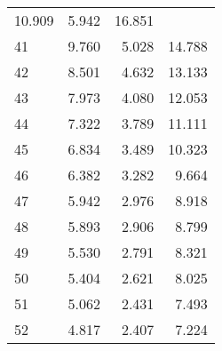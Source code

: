 \begin{tabular}{llll}
  \multicolumn{1}{|r}{10.909} &
  \multicolumn{1}{r}{5.942} &
  \multicolumn{1}{r}{16.851} \\
\multicolumn{1}{l}{\hspace{1em}41} &
  \multicolumn{1}{|r}{9.760} &
  \multicolumn{1}{r}{5.028} &
  \multicolumn{1}{r}{14.788} \\
\multicolumn{1}{l}{\hspace{1em}42} &
  \multicolumn{1}{|r}{8.501} &
  \multicolumn{1}{r}{4.632} &
  \multicolumn{1}{r}{13.133} \\
\multicolumn{1}{l}{\hspace{1em}43} &
  \multicolumn{1}{|r}{7.973} &
  \multicolumn{1}{r}{4.080} &
  \multicolumn{1}{r}{12.053} \\
\multicolumn{1}{l}{\hspace{1em}44} &
  \multicolumn{1}{|r}{7.322} &
  \multicolumn{1}{r}{3.789} &
  \multicolumn{1}{r}{11.111} \\
\multicolumn{1}{l}{\hspace{1em}45} &
  \multicolumn{1}{|r}{6.834} &
  \multicolumn{1}{r}{3.489} &
  \multicolumn{1}{r}{10.323} \\
\multicolumn{1}{l}{\hspace{1em}46} &
  \multicolumn{1}{|r}{6.382} &
  \multicolumn{1}{r}{3.282} &
  \multicolumn{1}{r}{9.664} \\
\multicolumn{1}{l}{\hspace{1em}47} &
  \multicolumn{1}{|r}{5.942} &
  \multicolumn{1}{r}{2.976} &
  \multicolumn{1}{r}{8.918} \\
\multicolumn{1}{l}{\hspace{1em}48} &
  \multicolumn{1}{|r}{5.893} &
  \multicolumn{1}{r}{2.906} &
  \multicolumn{1}{r}{8.799} \\
\multicolumn{1}{l}{\hspace{1em}49} &
  \multicolumn{1}{|r}{5.530} &
  \multicolumn{1}{r}{2.791} &
  \multicolumn{1}{r}{8.321} \\
\multicolumn{1}{l}{\hspace{1em}50} &
  \multicolumn{1}{|r}{5.404} &
  \multicolumn{1}{r}{2.621} &
  \multicolumn{1}{r}{8.025} \\
\multicolumn{1}{l}{\hspace{1em}51} &
  \multicolumn{1}{|r}{5.062} &
  \multicolumn{1}{r}{2.431} &
  \multicolumn{1}{r}{7.493} \\
\multicolumn{1}{l}{\hspace{1em}52} &
  \multicolumn{1}{|r}{4.817} &
  \multicolumn{1}{r}{2.407} &
  \multicolumn{1}{r}{7.224} \\

\end{tabular}

